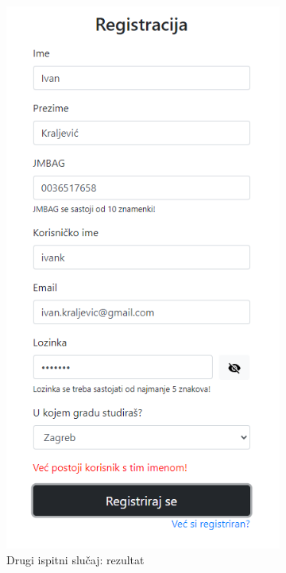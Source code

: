  		
 			\begin{figure}[H]
 				\centering
 				\begin{subfigure}{.5\textwidth}
 					\centering
 					\includegraphics[scale=0.3]{slike/test2Ekran.png}
 					\caption{Drugi ispitni slučaj: rezultat}
 					\label{fig:drugiIspitniSlucaj}
 				\end{subfigure}%
 				\begin{subfigure}{.5\textwidth}
 					\centering

\end{subfigure}
\end{figure}
